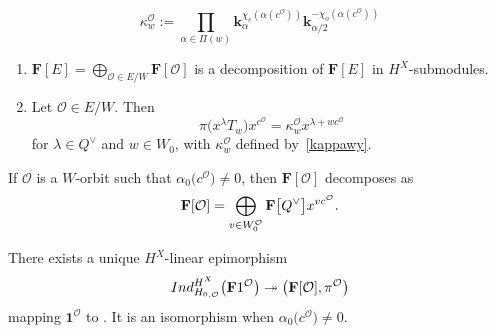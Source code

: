 \documentclass[10pt,a4paper]{amsart}
\begin{document}
\begin{equation}\label{kappawy}
\kappa_w^\mathcal{O}:=\prod_{\alpha\in\Pi(w)}\mathbf{k}_\alpha^{\chi_e(\alpha(c^\mathcal{O}))}\mathbf{k}_{\alpha/2}^{-\chi_o(\alpha(c^\mathcal{O}))}
\end{equation}

\begin{Corollary}\label{corpsi}\hfill
\begin{enumerate}\itemsep=0pt
\item[$(1)$] $\mathbf{F}[E]=\bigoplus_{\mathcal{O}\in E/W}\mathbf{F}[\mathcal{O}]$ is a decomposition of $\mathbf{F}[E]$ in $H^X$-submodules.
\item[$(2)$] Let $\mathcal{O}\in E/W$. Then
\begin{equation*}%
\pi\bigl(x^\lambda T_w\bigr)x^{c^\mathcal{O}}=\kappa_w^\mathcal{O}x^{\lambda+wc^\mathcal{O}}
\end{equation*}
for $\lambda\in Q^\vee$ and $w\in W_0$,
with $\kappa_w^\mathcal{O}$ defined by~\eqref{kappawy}.
\end{enumerate}
\end{Corollary}

\begin{Lemma}\label{Pcpoldec}
If $\mathcal{O}$ is a $W$-orbit such that $\alpha_0\bigl(c^\mathcal{O}\bigr)\not=0$, then
$\mathbf{F}[\mathcal{O}]$ decomposes as
\begin{equation}\label{FpoldecI}
\mathbf{F}[\mathcal{O}]=\bigoplus_{v\in W_0^\mathcal{O}}\mathbf{F}\smash{\bigl[Q^\vee\bigr]}x^{vc^\mathcal{O}}.
\end{equation}
\end{Lemma}

\begin{Proposition}\label{indcor}
There exists a unique $H^X$-linear epimorphism
\begin{equation}\label{epiuse}
{\rm Ind}_{H_{0,\mathcal{O}}}^{H^X}\bigl(\mathbf{F}1^{\mathcal{O}}\bigr)\twoheadrightarrow
\bigl(\mathbf{F}[\mathcal{O}],\pi^\mathcal{O}\bigr)
\end{equation}
mapping $\mathbf{1}^{\mathcal{O}}$ to . It is an isomorphism when $\alpha_0\bigl(c^\mathcal{O}\bigr)\not=0$.
\end{Proposition}
\end{document}
